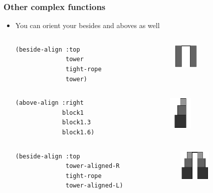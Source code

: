 \documentclass{beamer}
\begin{document}
\begin{frame}[fragile]
	\frametitle{Other complex functions}
	\begin{itemize}
	\item You can orient your besides and aboves as well
	\begin{columns}[t]
		\begin{column}{.45\textwidth}
		\begin{verbatim}
(beside-align :top 
              tower 
              tight-rope 
              tower)
		\end{verbatim}
		\end{column}
		\begin{column}{.3\textwidth}
		\begin{figure}[h]
			\includegraphics[width=1.22cm]{PresentationImages/towers.png}
			\end{figure}		
		\end{column}
		\end{columns} 
		\begin{columns}[t]
		\begin{column}{.45\textwidth}
		\begin{verbatim}
(above-align :right 
             block1 
             block1.3
             block1.6)
		\end{verbatim}
		\end{column}
		\begin{column}{.3\textwidth}
		\begin{figure}[h]
			\includegraphics[width=1.1cm]{PresentationImages/left-tower.png}
			\end{figure}		
		\end{column}
		\end{columns} 
		\begin{columns}[t]
		\begin{column}{.45\textwidth}
		\begin{verbatim}
(beside-align :top 
              tower-aligned-R 
              tight-rope 
              tower-aligned-L)
		\end{verbatim}
		\end{column}
		\begin{column}{.3\textwidth}
		\begin{figure}[h]
			\includegraphics[width=1.5cm]{PresentationImages/two-tower.png}
			\end{figure}		
		\end{column}
		\end{columns}
	\end{itemize}
	
\end{frame}
\end{document}
